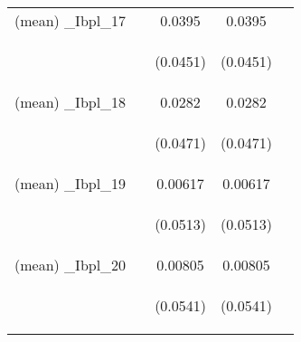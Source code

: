 \documentclass[]{article}
\begin{document}
\begin{center}
\begin{tabular}{lcccc}
(mean) \_Ibpl\_17 &  & 0.0395 & 0.0395 &  \\
\vspace{4pt} & \begin{footnotesize}\end{footnotesize} & \begin{footnotesize}(0.0451)\end{footnotesize} & \begin{footnotesize}(0.0451)\end{footnotesize} & \begin{footnotesize}\end{footnotesize} \\
(mean) \_Ibpl\_18 &  & 0.0282 & 0.0282 &  \\
\vspace{4pt} & \begin{footnotesize}\end{footnotesize} & \begin{footnotesize}(0.0471)\end{footnotesize} & \begin{footnotesize}(0.0471)\end{footnotesize} & \begin{footnotesize}\end{footnotesize} \\
(mean) \_Ibpl\_19 &  & 0.00617 & 0.00617 &  \\
\vspace{4pt} & \begin{footnotesize}\end{footnotesize} & \begin{footnotesize}(0.0513)\end{footnotesize} & \begin{footnotesize}(0.0513)\end{footnotesize} & \begin{footnotesize}\end{footnotesize} \\
(mean) \_Ibpl\_20 &  & 0.00805 & 0.00805 &  \\
\vspace{4pt} & \begin{footnotesize}\end{footnotesize} & \begin{footnotesize}(0.0541)\end{footnotesize} & \begin{footnotesize}(0.0541)\end{footnotesize} & \begin{footnotesize}\end{footnotesize} \\

\end{tabular}
\end{center}
\end{document}
